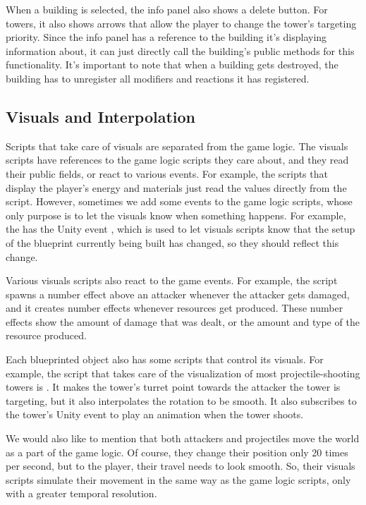 When a building is selected, the info panel also shows a delete button.
For towers, it also shows arrows that allow the player to change the tower's targeting priority.
Since the info panel has a reference to the building it's displaying information about, it can just directly call the building's public methods for this functionality.
It's important to note that when a building gets destroyed, the building has to unregister all modifiers and reactions it has registered.

\subsection{Visuals and Interpolation}

Scripts that take care of visuals are separated from the game logic.
The visuals scripts have references to the game logic scripts they care about, and they read their public fields, or react to various events.
For example, the scripts that display the player's energy and materials just read the values directly from the  script.
However, sometimes we add some events to the game logic scripts, whose only purpose is to let the visuals know when something happens.
For example, the  has the Unity event , which is used to let visuals scripts know that the setup of the blueprint currently being built has changed, so they should reflect this change.

Various visuals scripts also react to the game events.
For example, the  script spawns a number effect above an attacker whenever the attacker gets damaged, and it creates number effects whenever resources get produced.
These number effects show the amount of damage that was dealt, or the amount and type of the resource produced.

Each blueprinted object also has some scripts that control its visuals.
For example, the script that takes care of the visualization of most projectile-shooting towers is .
It makes the tower's turret point towards the attacker the tower is targeting, but it also interpolates the rotation to be smooth.
It also subscribes to the tower's  Unity event to play an animation when the tower shoots.

We would also like to mention that both attackers and projectiles move the world as a part of the game logic.
Of course, they change their position only 20 times per second, but to the player, their travel needs to look smooth.
So, their visuals scripts simulate their movement in the same way as the game logic scripts, only with a greater temporal resolution.

